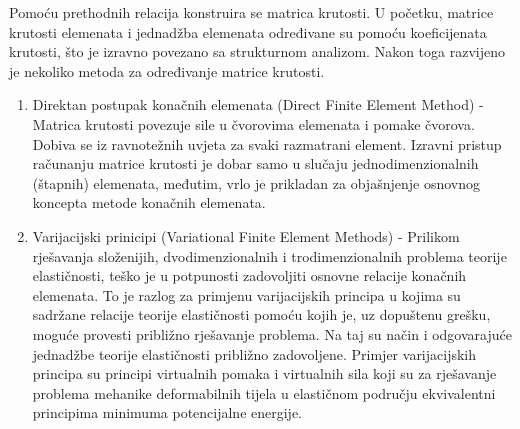 \documentclass[a4paper,twoside,12pt]{memoir} %
\begin{document}
Pomoću prethodnih relacija konstruira se matrica krutosti. U početku, matrice krutosti elemenata i jednadžba elemenata određivane su pomoću koeficijenata krutosti, što je izravno povezano sa strukturnom analizom. Nakon toga razvijeno je nekoliko metoda za određivanje matrice krutosti.
\begin{enumerate}
    \item Direktan postupak konačnih elemenata (Direct Finite Element Method) -
    Matrica krutosti povezuje sile u čvorovima elemenata i pomake čvorova. Dobiva se iz ravnotežnih uvjeta za svaki razmatrani element. Izravni pristup računanju matrice krutosti je dobar samo u slučaju jednodimenzionalnih (štapnih) elemenata, međutim, vrlo je prikladan za objašnjenje osnovnog koncepta metode konačnih elemenata.
    
    \item Varijacijski prinicipi (Variational Finite Element Methods) -
    Prilikom rješavanja složenijih, dvodimenzionalnih i trodimenzionalnih problema teorije elastičnosti, teško je u potpunosti zadovoljiti osnovne relacije konačnih elemenata. To je razlog za primjenu varijacijskih principa u kojima su sadržane relacije teorije elastičnosti pomoću kojih je, uz dopuštenu grešku, moguće provesti približno rješavanje problema. Na taj su način i odgovarajuće jednadžbe teorije elastičnosti približno zadovoljene. Primjer varijacijskih principa su principi virtualnih pomaka i virtualnih sila koji su za rješavanje problema mehanike deformabilnih tijela u elastičnom području ekvivalentni principima minimuma potencijalne energije.
    

\end{enumerate}
\end{document}
